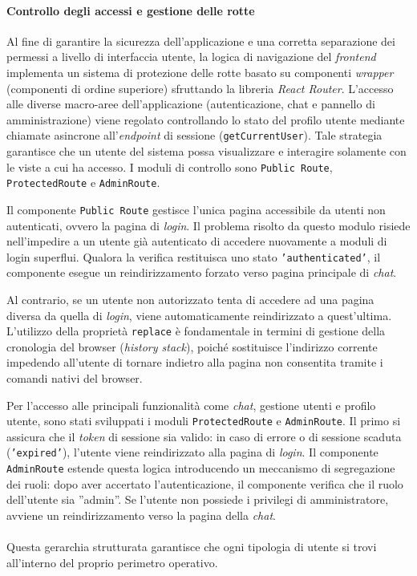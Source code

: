\paragraph{Controllo degli accessi e gestione delle rotte}
Al fine di garantire la sicurezza dell'applicazione e una corretta separazione 
dei permessi a livello di interfaccia utente, la logica di navigazione del 
\textit{frontend} implementa un sistema di protezione delle rotte basato su 
componenti \textit{wrapper} (componenti di ordine superiore) sfruttando la 
libreria \textit{React Router}. 
L'accesso alle diverse macro-aree dell'applicazione (autenticazione, 
chat e pannello di amministrazione) viene regolato controllando 
lo stato del profilo utente mediante chiamate asincrone all'\textit{endpoint} di 
sessione (\texttt{getCurrentUser}). 
Tale strategia garantisce che un utente del sistema possa visualizzare e 
interagire solamente con le viste a cui ha accesso.
I moduli di controllo sono \texttt{Public Route}, \texttt{ProtectedRoute} e 
\texttt{AdminRoute}.

Il componente \texttt{Public Route} gestisce l'unica pagina accessibile da utenti non 
autenticati, ovvero la pagina di \textit{login}. 
Il problema risolto da questo modulo risiede nell'impedire a un utente già 
autenticato di accedere nuovamente a moduli di login superflui. 
Qualora la verifica restituisca uno stato \texttt{'authenticated'}, il 
componente esegue un reindirizzamento forzato verso pagina principale di \textit{chat}.

Al contrario, se un utente non autorizzato tenta di accedere ad una pagina diversa 
da quella di \textit{login}, viene automaticamente reindirizzato a quest'ultima.
L'utilizzo della proprietà \texttt{replace} è fondamentale in termini di gestione 
della cronologia del browser (\textit{history stack}), poiché sostituisce 
l'indirizzo corrente impedendo all'utente di tornare indietro alla pagina 
non consentita tramite i comandi nativi del browser.

Per l'accesso alle principali funzionalità come \textit{chat}, gestione utenti 
e profilo utente, sono stati sviluppati i moduli 
\texttt{ProtectedRoute} e \texttt{AdminRoute}. 
Il primo si assicura che il \textit{token} di sessione sia valido: in caso di errore o di 
sessione scaduta (\texttt{'expired'}), l'utente viene reindirizzato alla 
pagina di \textit{login}. Il componente \texttt{AdminRoute} estende questa 
logica introducendo un meccanismo di segregazione dei ruoli: dopo aver 
accertato l'autenticazione, il componente verifica che il ruolo dell'utente 
sia ''admin''. 
Se l'utente non possiede i privilegi di amministratore, avviene un reindirizzamento 
verso la pagina della \textit{chat}. 
\\\\Questa gerarchia strutturata garantisce che ogni 
tipologia di utente si trovi all'interno del proprio perimetro 
operativo.


